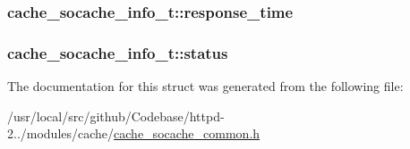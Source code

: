 \subsubsection[{\texorpdfstring{response\+\_\+time}{response_time}}]{ cache\+\_\+socache\+\_\+info\+\_\+t\+::response\+\_\+time}\hypertarget{structcache__socache__info__t_aff77b1740bb5e4b2b2aa027bfd7cabf7}{}\label{structcache__socache__info__t_aff77b1740bb5e4b2b2aa027bfd7cabf7}
\subsubsection[{\texorpdfstring{status}{status}}]{ cache\+\_\+socache\+\_\+info\+\_\+t\+::status}\hypertarget{structcache__socache__info__t_aaa8d9cb043949025aa3eaca6bf15a0fd}{}\label{structcache__socache__info__t_aaa8d9cb043949025aa3eaca6bf15a0fd}


The documentation for this struct was generated from the following file\+:\begin{DoxyCompactItemize}
\item 
/usr/local/src/github/\+Codebase/httpd-\/2../modules/cache/\hyperlink{cache__socache__common_8h}{cache\+\_\+socache\+\_\+common.\+h}\end{DoxyCompactItemize}
